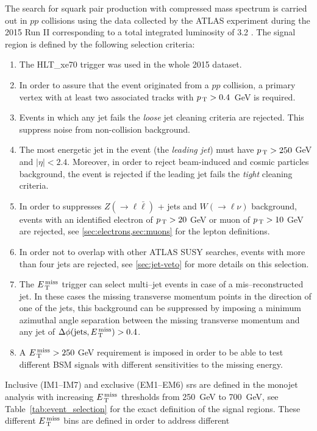 The search for squark pair production with compressed mass spectrum is carried
out in $pp$ collisions using the data collected by the ATLAS experiment during
the 2015 Run II corresponding to a total integrated luminosity of 3.2 \ifb. The
signal region is defined by the following selection criteria:
\begin{enumerate}[A -]
\item The HLT\_xe70 trigger was used in the whole 2015 dataset.
\item In order to assure that the event originated from a $pp$ collision, a
  primary vertex with at least two associated tracks with $p_\mathrm{\, T} > 0.4$~GeV is
  required.
\item Events in which any jet fails the \emph{loose} jet cleaning criteria are
  rejected. This suppress noise from non-collision background.
\item The most energetic jet in the event (the \emph{leading jet}) must have
  $p_\mathrm{\, T} > 250~$GeV and $|\eta| < 2.4$. Moreover, in order to reject beam-induced
  and cosmic particles background, the event is rejected if the leading jet
  fails the \emph{tight} cleaning criteria.
\item In order to suppresses $Z (\rightarrow \ell \bar{\ell})$ + jets and
  $W (\rightarrow \ell \nu)$ background, events with an identified electron of
  $p_\mathrm{\, T} > 20~$GeV or muon of $p_\mathrm{\, T} > 10~$GeV are rejected, see
  \cref{sec:electrons,sec:muons} for the lepton definitions.
\item In order not to overlap with other ATLAS SUSY searches, events with more
  than four jets are rejected, see \cref{sec:jet-veto} for more details on this
  selection.
\item The $E_\mathrm{\, T}^\mathrm{\, miss}$ trigger can select multi--jet events in case of a
  mis--reconstructed jet. In these cases the missing transverse momentum points
  in the direction of one of the jets, this background can be suppressed by
  imposing a minimum azimuthal angle separation between the missing transverse
  momentum and any jet of $\Delta \phi (\mathrm{jets}, E_\mathrm{\, T}^\mathrm{\, miss}) > 0.4$.
\item A $E_\mathrm{\, T}^\mathrm{\, miss} > 250~$GeV requirement is imposed in order to be able to test
  different BSM signals with different sensitivities to the missing energy.
\end{enumerate}
Inclusive (IM1--IM7) and exclusive (EM1--EM6) \glspl{sr} are defined in the
monojet analysis with increasing $E_\mathrm{\, T}^\mathrm{\, miss}$ thresholds from 250~GeV to 700~GeV, see
Table~\ref{tab:event_selection} for the exact definition of the signal
regions. These different $E_\mathrm{\, T}^\mathrm{\, miss}$ bins are defined in order to address different

